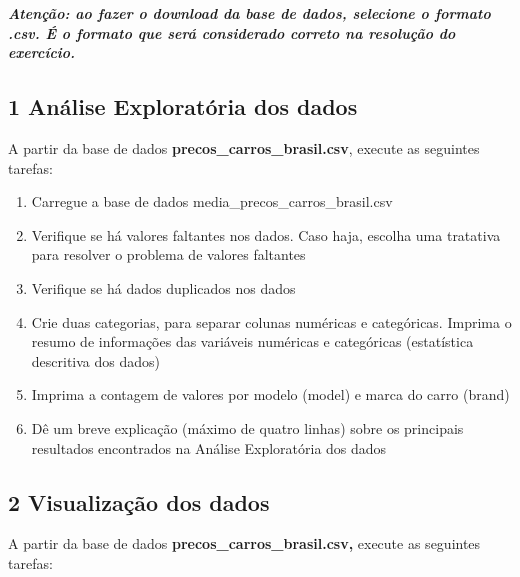 \textbf{\textit{Atenção: ao fazer o download da base de dados, selecione o formato .csv. É o formato que será
considerado correto na resolução do exercício.}}



\newpage
\subsection*{\textbf{1 Análise Exploratória dos dados}}



A partir da base de dados \textbf{precos\_carros\_brasil.csv}, execute as seguintes tarefas:

\begin{enumerate}[series=listWWNumxi,label=\alph*.,ref=\alph*]
\item Carregue a base de dados media\_precos\_carros\_brasil.csv
\item Verifique se há valores faltantes nos dados. Caso haja, escolha uma tratativa para resolver o problema de valores
faltantes
\item Verifique se há dados duplicados nos dados
\item Crie duas categorias, para separar colunas numéricas e categóricas. Imprima o resumo de informações das variáveis
numéricas e categóricas (estatística descritiva dos dados)
\item Imprima a contagem de valores por modelo (model) e marca do carro (brand)
\item Dê um breve explicação (máximo de quatro linhas) sobre os principais resultados encontrados na Análise
Exploratória dos dados
\end{enumerate}


\subsection*{\textbf{2 Visualização dos dados}}

A partir da base de dados \textbf{precos\_carros\_brasil.csv,} execute as seguintes tarefas:

